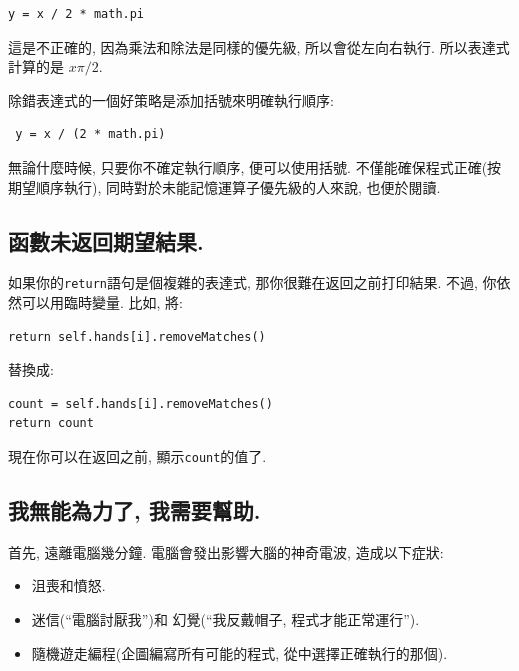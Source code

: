 \documentclass[10pt]{book}
\begin{document}
\begin{verbatim}
y = x / 2 * math.pi
\end{verbatim}
%
這是不正確的, 因為乘法和除法是同樣的優先級, 所以會從左向右執行. 
所以表達式計算的是 $x \pi / 2$.

除錯表達式的一個好策略是添加括號來明確執行順序:

\begin{verbatim}
 y = x / (2 * math.pi)
\end{verbatim}
%
無論什麼時候, 只要你不確定執行順序, 便可以使用括號. 
不僅能確保程式正確(按期望順序執行), 同時對於未能記憶運算子優先級的人來說, 
也便於閱讀. 


\subsection{函數未返回期望結果.}

如果你的{\tt return}語句是個複雜的表達式, 
那你很難在返回之前打印結果. 
不過, 你依然可以用臨時變量. 
比如, 將:

\begin{verbatim}
return self.hands[i].removeMatches()
\end{verbatim}
%
替換成:

\begin{verbatim}
count = self.hands[i].removeMatches()
return count
\end{verbatim}
%
現在你可以在返回之前, 顯示{\tt count}的值了.


\subsection{我無能為力了, 我需要幫助.}

首先, 遠離電腦幾分鐘. 
電腦會發出影響大腦的神奇電波, 造成以下症狀:

\begin{itemize}

\item 沮喪和憤怒.

\item 迷信(``電腦討厭我'')和
幻覺(``我反戴帽子, 程式才能正常運行'').

\item 隨機遊走編程(企圖編寫所有可能的程式, 從中選擇正確執行的那個).

\end{itemize}
\end{document}
